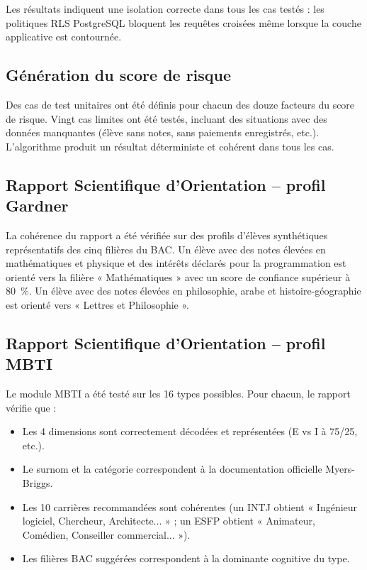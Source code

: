 \documentclass[12pt,a4paper,oneside]{report}
\begin{document}
Les résultats indiquent une isolation correcte dans tous les cas testés : les politiques RLS PostgreSQL bloquent les requêtes croisées même lorsque la couche applicative est contournée.

\subsection{Génération du score de risque}

Des cas de test unitaires ont été définis pour chacun des douze facteurs du score de risque. Vingt cas limites ont été testés, incluant des situations avec des données manquantes (élève sans notes, sans paiements enregistrés, etc.). L'algorithme produit un résultat déterministe et cohérent dans tous les cas.

\subsection{Rapport Scientifique d'Orientation -- profil Gardner}

La cohérence du rapport a été vérifiée sur des profils d'élèves synthétiques représentatifs des cinq filières du BAC. Un élève avec des notes élevées en mathématiques et physique et des intérêts déclarés pour la programmation est orienté vers la filière « Mathématiques » avec un score de confiance supérieur à 80~\%. Un élève avec des notes élevées en philosophie, arabe et histoire-géographie est orienté vers « Lettres et Philosophie ».

\subsection{Rapport Scientifique d'Orientation -- profil MBTI}

Le module MBTI a été testé sur les 16 types possibles. Pour chacun, le rapport vérifie que :
\begin{itemize}
  \item Les 4 dimensions sont correctement décodées et représentées (E vs I à 75/25, etc.).
  \item Le surnom et la catégorie correspondent à la documentation officielle Myers-Briggs.
  \item Les 10 carrières recommandées sont cohérentes (un INTJ obtient « Ingénieur logiciel, Chercheur, Architecte... » ; un ESFP obtient « Animateur, Comédien, Conseiller commercial... »).
  \item Les filières BAC suggérées correspondent à la dominante cognitive du type.
\end{itemize}
\end{document}
